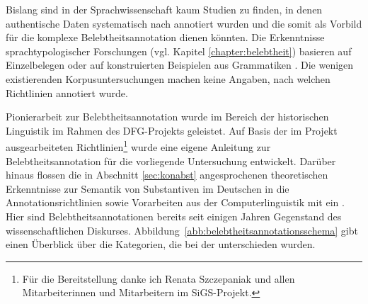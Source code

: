 
Bislang sind in der Sprachwissenschaft kaum Studien zu finden, in denen authentische Daten systematisch nach  annotiert  wurden und die somit als Vorbild für die komplexe  Belebtheitsannotation dienen könnten. Die Erkenntnisse sprachtypologischer Forschungen (vgl. Kapitel \ref{chapter:belebtheit}) basieren auf Einzelbelegen oder auf konstruierten Beispielen aus Grammatiken \parencite[z.B.][]{Comrie1989,Corbett2000,Aissen2003}. Die wenigen existierenden Korpusuntersuchungen  \parencite{Dahl1996,Yamamoto1999} machen keine Angaben, nach welchen Richtlinien annotiert  wurde.

Pionierarbeit zur Belebtheitsannotation wurde im Bereich der historischen Linguistik im Rahmen des DFG-Projekts  \parencite[vgl.][]{Szczepaniak2016} geleistet. Auf Basis der im Projekt ausgearbeiteten Richtlinien\footnote{Für die Bereitstellung danke ich Renata Szczepaniak und allen Mitarbeiterinnen und Mitarbeitern im SiGS-Projekt.} wurde eine eigene Anleitung zur Belebtheitsannotation für die vorliegende Untersuchung entwickelt. Darüber hinaus flossen die in Abschnitt \ref{sec:konabst} angesprochenen theoretischen Erkenntnisse zur Semantik von Substantiven  im Deutschen \parencite[u.a.][]{Ewald1992,Studler2011} in die Annotationsrichtlinien sowie  Vorarbeiten aus der Computerlinguistik mit ein \parencite[vgl.][]{Garretson2004,Zaenen2004,Ovrelid2009}. Hier sind Belebtheitsannotationen bereits seit einigen Jahren Gegenstand des wissenschaftlichen Diskurses. Abbildung~\ref{abb:belebtheitsannotationsschema} gibt einen Überblick über die Kategorien, die bei der  unterschieden wurden.

